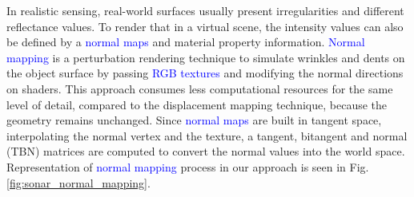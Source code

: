 \documentclass[final,5p,times]{elsarticle}
\begin{document}
In realistic sensing, real-world surfaces usually present irregularities
and different reflectance values. To render that in a virtual scene, the
intensity values can also be defined by a \textcolor{blue}{normal maps} and material
property information. \textcolor{blue}{Normal mapping} is a perturbation rendering technique
to simulate wrinkles and dents on the object surface by passing \textcolor{blue}{RGB textures} and modifying
the normal directions on shaders. This approach consumes less computational
resources for the same level of detail, compared to the displacement mapping
technique, because the geometry remains unchanged. Since \textcolor{blue}{normal maps} are
built in tangent space, interpolating the normal vertex and the texture,
a tangent, bitangent and normal (TBN) matrices are computed to convert the
normal values into the world space. Representation of \textcolor{blue}{normal mapping} process
in our approach is seen in Fig. \ref{fig:sonar_normal_mapping}.
\end{document}
